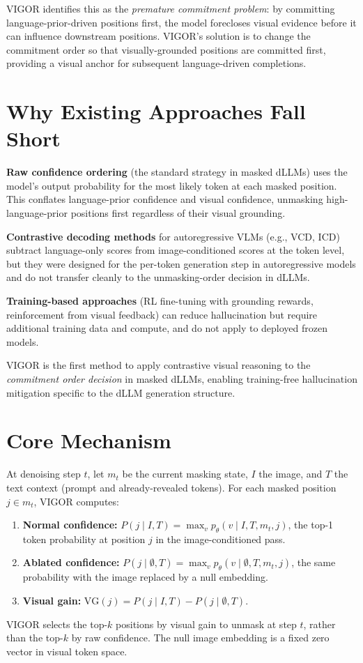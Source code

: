 \documentclass[10pt,twocolumn]{article}
\begin{document}
VIGOR identifies this as the \emph{premature commitment problem}: by committing
language-prior-driven positions first, the model forecloses visual evidence
before it can influence downstream positions. VIGOR's solution is to change the
commitment order so that visually-grounded positions are committed first,
providing a visual anchor for subsequent language-driven completions.

\section{Why Existing Approaches Fall Short}

\textbf{Raw confidence ordering} (the standard strategy in masked dLLMs) uses
the model's output probability for the most likely token at each masked position.
This conflates language-prior confidence and visual confidence, unmasking
high-language-prior positions first regardless of their visual grounding.

\textbf{Contrastive decoding methods} for autoregressive VLMs (e.g., VCD, ICD)
subtract language-only scores from image-conditioned scores at the token level,
but they were designed for the per-token generation step in autoregressive models
and do not transfer cleanly to the unmasking-order decision in dLLMs.

\textbf{Training-based approaches} (RL fine-tuning with grounding rewards,
reinforcement from visual feedback) can reduce hallucination but require
additional training data and compute, and do not apply to deployed frozen models.

VIGOR is the first method to apply contrastive visual reasoning to the
\emph{commitment order decision} in masked dLLMs, enabling training-free
hallucination mitigation specific to the dLLM generation structure.

\section{Core Mechanism}

At denoising step $t$, let $m_t$ be the current masking state, $I$ the image,
and $T$ the text context (prompt and already-revealed tokens). For each masked
position $j \in m_t$, VIGOR computes:
\begin{enumerate}[itemsep=2pt,parsep=0pt]
  \item \textbf{Normal confidence:} $P(j \mid I, T) = \max_v p_\theta(v \mid I, T, m_t, j)$,
    the top-1 token probability at position $j$ in the image-conditioned pass.
  \item \textbf{Ablated confidence:} $P(j \mid \emptyset, T) = \max_v p_\theta(v \mid \emptyset, T, m_t, j)$,
    the same probability with the image replaced by a null embedding.
  \item \textbf{Visual gain:} $\text{VG}(j) = P(j \mid I, T) - P(j \mid \emptyset, T)$.
\end{enumerate}
VIGOR selects the top-$k$ positions by visual gain to unmask at step $t$,
rather than the top-$k$ by raw confidence. The null image embedding is a fixed
zero vector in visual token space.
\end{document}
